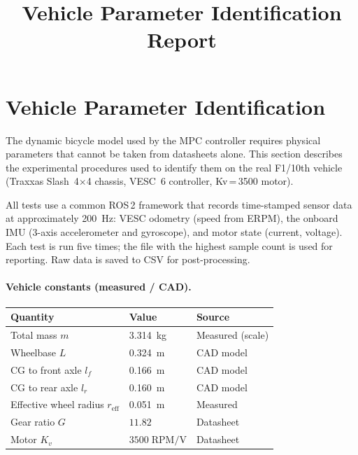 \documentclass[11pt,a4paper]{article}
\title{Vehicle Parameter Identification Report}
\author{}
\date{}
\begin{document}
\maketitle

\section{Vehicle Parameter Identification}\label{sec:param-id}

The dynamic bicycle model used by the MPC controller requires physical
parameters that cannot be taken from datasheets alone.
This section describes the experimental procedures used to identify
them on the real F1/10th vehicle (Traxxas Slash~4$\times$4 chassis,
VESC~6 controller, Kv\,=\,3500 motor).

All tests use a common ROS\,2 framework that records time-stamped
sensor data at approximately \SI{200}{\hertz}:
VESC odometry (speed from ERPM), the onboard IMU (3-axis accelerometer
and gyroscope), and motor state (current, voltage).
Each test is run five times; the file with the highest sample count
is used for reporting.  Raw data is saved to CSV for post-processing.

\paragraph{Vehicle constants (measured / CAD).}
\begin{table}[H]
\centering
\begin{tabular}{lll}
\toprule
\textbf{Quantity} & \textbf{Value} & \textbf{Source} \\
\midrule
Total mass $m$           & \SI{3.314}{\kilogram}  & Measured (scale) \\
Wheelbase $L$            & \SI{0.324}{\metre}     & CAD model \\
CG to front axle $l_f$  & \SI{0.166}{\metre}     & CAD model \\
CG to rear axle $l_r$   & \SI{0.160}{\metre}     & CAD model \\
Effective wheel radius $r_\text{eff}$ & \SI{0.051}{\metre} & Measured \\
Gear ratio $G$           & $11.82$                & Datasheet \\
Motor $K_v$              & $3500\;\text{RPM/V}$   & Datasheet \\
\bottomrule
\end{tabular}
\end{table}

\end{document}
